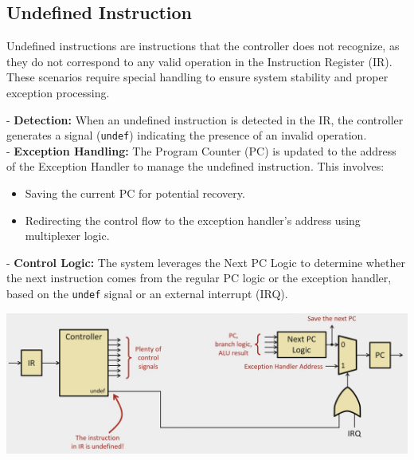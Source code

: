 \subsection{Undefined Instruction}

Undefined instructions are instructions that the controller does not recognize, as they do not correspond to any valid operation in the Instruction Register (IR). These scenarios require special handling to ensure system stability and proper exception processing.

\vspace{0.5cm}
\begin{minipage}[htp]{0.35\textwidth}
- \textbf{Detection:} When an undefined instruction is detected in the IR, the controller generates a signal (\texttt{undef}) indicating the presence of an invalid operation. \\ 
- \textbf{Exception Handling:} The Program Counter (PC) is updated to the address of the Exception Handler to manage the undefined instruction. This involves: \\
\begin{itemize}
\item Saving the current PC for potential recovery.
\item Redirecting the control flow to the exception handler's address using multiplexer logic.
\end{itemize}
- \textbf{Control Logic:} The system leverages the Next PC Logic to determine whether the next instruction comes from the regular PC logic or the exception handler, based on the \texttt{undef} signal or an external interrupt (IRQ).
\end{minipage}
\hfill
\vline
\hfill
\begin{minipage}[htp]{0.55\textwidth}
    \begin{center}
        \includegraphics[width=1.2\textwidth]{chapters/chapter2d/images/undefined.png}
    \end{center}
\end{minipage} \\
\vspace{0.5cm}
